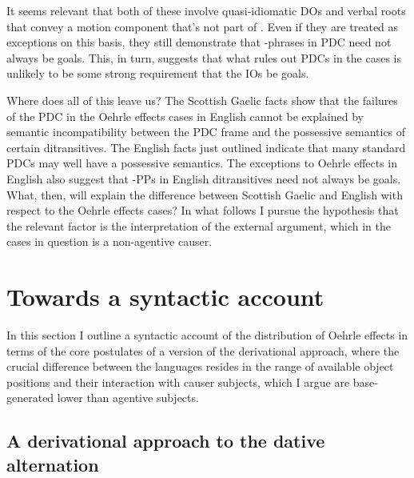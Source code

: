 \documentclass[output=paper,colorlinks,citecolor=brown]{langscibook}
\begin{document}


\noindent It seems relevant that both of these involve quasi-idiomatic DOs and verbal roots that convey a motion component that's not part of . Even if they are treated as exceptions on this basis, they still demonstrate that -phrases in PDC need not always be goals. This, in turn, suggests that what rules out PDCs in the  cases is unlikely to be some strong requirement that the IOs be goals. 

Where does all of this leave us? The Scottish Gaelic facts show that the failures of the PDC in the Oehrle effects cases in English cannot be explained by semantic incompatibility between the PDC frame and the possessive semantics of certain ditransitives. The English facts just outlined indicate that many standard PDCs may well have a possessive semantics. The exceptions to Oehrle effects in English also suggest that -PPs in English ditransitives need not always be goals. What, then, will explain the difference between Scottish Gaelic and English with respect to the Oehrle effects cases? In what follows I pursue the hypothesis that the relevant factor is the interpretation of the external argument, which in the cases in question is a non-agentive causer. 

\section{Towards a syntactic account}

In this section I outline a syntactic account of the distribution of Oehrle effects in terms of the core postulates of a version of the derivational approach, where the crucial difference between the languages resides in the range of available object positions and their interaction with causer subjects, which I argue are base-generated lower than agentive subjects. 

\subsection{A derivational approach to the dative alternation}
\end{document}
